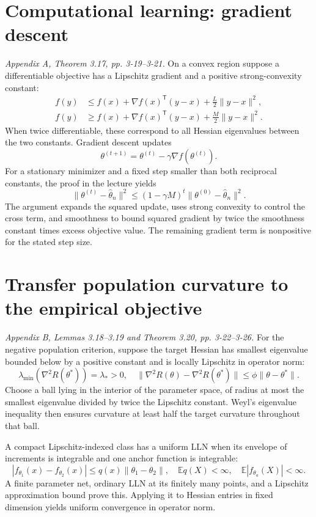 \documentclass[12pt]{article}
\newcommand{\E}{\mathbb E}
\begin{document}
\section{Computational learning: gradient descent}
\textit{Appendix A, Theorem 3.17, pp. 3-19--3-21.}
On a convex region suppose a differentiable objective has a Lipschitz
gradient and a positive strong-convexity constant:
\begin{align}
 f(y)&\le f(x)+\nabla f(x)^{\mathsf T}(y-x)+\tfrac L2\|y-x\|^2,\\
 f(y)&\ge f(x)+\nabla f(x)^{\mathsf T}(y-x)+\tfrac M2\|y-x\|^2.
\end{align}
When twice differentiable, these correspond to all Hessian eigenvalues
between the two constants. Gradient descent updates
\begin{equation}
 \theta^{(t+1)}=\theta^{(t)}-\gamma\nabla f(\theta^{(t)}).
\end{equation}
For a stationary minimizer and a fixed step smaller than both reciprocal
constants, the proof in the lecture yields
\begin{equation}
 \|\theta^{(t)}-\widehat\theta_n\|^2
 \le(1-\gamma M)^t\|\theta^{(0)}-\widehat\theta_n\|^2.
\end{equation}
The argument expands the squared update, uses strong convexity to control
the cross term, and smoothness to bound squared gradient by twice the
smoothness constant times excess objective value. The remaining gradient
term is nonpositive for the stated step size.

\section{Transfer population curvature to the empirical objective}
\textit{Appendix B, Lemmas 3.18--3.19 and Theorem 3.20, pp. 3-22--3-26.}
For the negative population criterion, suppose the target Hessian has
smallest eigenvalue bounded below by a positive constant and is locally
Lipschitz in operator norm:
\begin{equation}
 \lambda_{\min}(\nabla^2R(\theta^*))=\lambda_*>0,\quad
 \|\nabla^2R(\theta)-\nabla^2R(\theta^*)\|\le\phi\|\theta-\theta^*\|.
\end{equation}
Choose a ball lying in the interior of the parameter space, of radius at
most the smallest eigenvalue divided by twice the Lipschitz constant.
Weyl's eigenvalue inequality then ensures curvature at least half the
target curvature throughout that ball.

A compact Lipschitz-indexed class has a uniform LLN when its envelope of
increments is integrable and one anchor function is integrable:
\begin{equation}
 |f_{\theta_1}(x)-f_{\theta_2}(x)|\le q(x)\|\theta_1-\theta_2\|,
 \quad\E q(X)<\infty,\quad\E|f_{\theta_a}(X)|<\infty.
\end{equation}
A finite parameter net, ordinary LLN at its finitely many points, and a
Lipschitz approximation bound prove this. Applying it to Hessian entries
in fixed dimension yields uniform convergence in operator norm.
\end{document}
